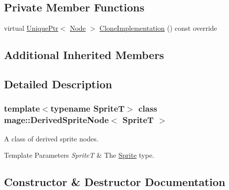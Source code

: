 \subsection*{Private Member Functions}
\begin{DoxyCompactItemize}
\item 
virtual \hyperlink{namespacemage_a3316d7143a973e37adf1110f2e80ca31}{Unique\+Ptr}$<$ \hyperlink{classmage_1_1_node}{Node} $>$ \hyperlink{classmage_1_1_derived_sprite_node_ae1aa2b80d4ff8688635df017826c11a5}{Clone\+Implementation} () const override
\end{DoxyCompactItemize}
\subsection*{Additional Inherited Members}


\subsection{Detailed Description}
\subsubsection*{template$<$typename SpriteT$>$\newline
class mage\+::\+Derived\+Sprite\+Node$<$ Sprite\+T $>$}

A class of derived sprite nodes.


\begin{DoxyTemplParams}{Template Parameters}
{\em SpriteT} & The \hyperlink{classmage_1_1_sprite}{Sprite} type. \\
\hline
\end{DoxyTemplParams}


\subsection{Constructor \& Destructor Documentation}
\hypertarget{classmage_1_1_derived_sprite_node_a04344d00f39577ef25a307a823e21685}{}\label{classmage_1_1_derived_sprite_node_a04344d00f39577ef25a307a823e21685} 
